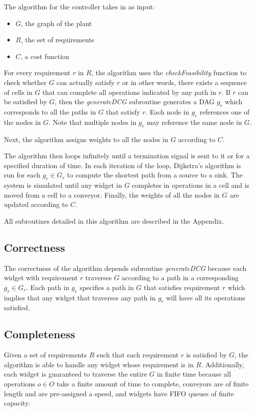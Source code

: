 \documentclass[9pt,conference, compsocconf]{IEEEtran}
\begin{document}
		The algorithm for the controller takes in as input:
		\begin{itemize}
			\item $G$, the graph of the plant
			\item $R$, the set of requirements
			\item $C$, a cost function
		\end{itemize}
	
		For every requirement $r$ in $R$, the algorithm uses the \emph{checkFeasibility} function to check whether $G$ can actually satisfy $r$ or in other words, there exists a sequence of cells in $G$ that can complete all operations indicated by any path in $r$. If $r$ can be satisfied by $G$, then the \emph{generateDCG} subroutine generates a DAG $g_r$ which corresponds to all the paths in $G$ that satisfy $r$. Each node in $g_r$ references one of the nodes in $G$. Note that multiple nodes in $g_r$ may reference the same node in $G$.
		
		Next, the algorithm assigns weights to all the nodes in $G$ according to $C$.
		
		The algorithm then loops infinitely until a termination signal is sent to it or for a specified duration of time. In each iteration of the loop, Dijkstra's algorithm is run for each $g_r \in G_r$ to compute the shortest path from a source to a sink. The system is simulated until any widget in $G$ completes in operations in a cell and is moved from a cell to a conveyor. Finally, the weights of all the nodes in $G$ are updated according to $C$.
		
		All subroutines detailed in this algorithm are described in the Appendix. 

	\subsection{Correctness}
		The correctness of the algorithm depends subroutine \emph{generateDCG} because each widget with requirement $r$ traverses $G$ according to a path in a corresponding $g_r \in G_r$. Each path in $g_r$ specifies a path in $G$ that satisfies requirement $r$ which implies that any widget that traverses any path in $g_r$ will have all its operations satisfied.
		
	\subsection{Completeness}
		Given a set of requirements $R$ such that each requirement $r$ is satisfied by $G$, the algorithm is able to handle any widget whose requirement is in $R$. Additionally, each widget is guaranteed to traverse the entire $G$ in finite time  because all operations $o \in O$ take a finite amount of time to complete, conveyors are of finite length and are pre-assigned a speed, and widgets have FIFO queues of finite capacity.  
\end{document}
